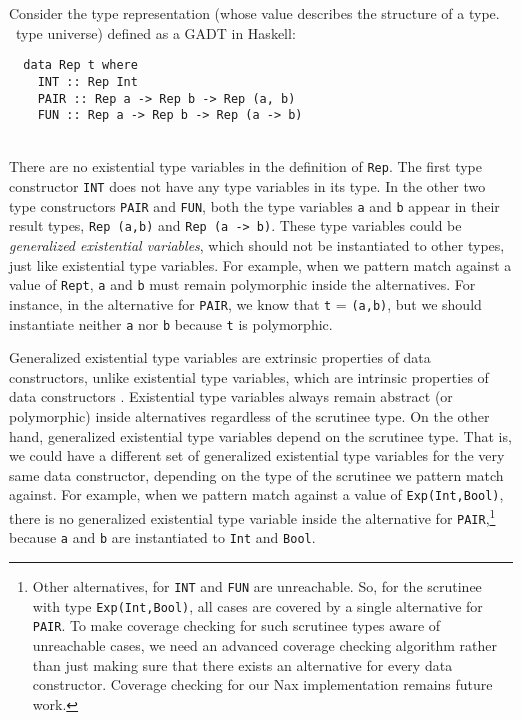 Consider the type representation (whose value describes the structure of
a type. \aka\ type universe) defined as a GADT in Haskell:
\vspace*{-5ex}
\begin{singlespace}
\begin{verbatim}
  data Rep t where
    INT :: Rep Int
    PAIR :: Rep a -> Rep b -> Rep (a, b)
    FUN :: Rep a -> Rep b -> Rep (a -> b)
\end{verbatim}
\end{singlespace}
~\vspace*{-5ex}\\
There are no existential type variables in the definition of \texttt{Rep}.
The first type constructor \texttt{INT} does not have any type variables
in its type. In the other two type constructors \texttt{PAIR} and \texttt{FUN},
both the type variables \texttt{a} and \texttt{b} appear in their result types,
\texttt{\;Rep~(a,b)\;} and \texttt{\;Rep~(a -> b)\;}. These type variables
could be \emph{generalized existential variables}, which should not be
instantiated to other types, just like existential type variables.
For example, when we pattern match against a value of \texttt{\;Rep\;t},
\texttt{a} and \texttt{b} must remain polymorphic inside the alternatives.
For instance, in the alternative for \texttt{PAIR}, we know that
\texttt{t} = \texttt{(a,b)}, but we should instantiate neither \texttt{a}
nor \texttt{b} because \texttt{t} is polymorphic.

Generalized existential type variables are
extrinsic properties of data constructors, unlike existential type variables,
which are intrinsic properties of data constructors \cite{Lin10thesis}.
Existential type variables always remain abstract (or polymorphic) inside
alternatives regardless of the scrutinee type. On the other hand,
generalized existential type variables depend on the scrutinee type. That is,
we could have a different set of generalized existential type variables
for the very same data constructor, depending on the type of the scrutinee
we pattern match against. For example, when we pattern match against
a value of \texttt{Exp\;(Int,Bool)}, there is no generalized existential
type variable inside the alternative for \texttt{PAIR},\footnote{
	Other alternatives, for \texttt{INT} and \texttt{FUN} are unreachable.
	So, for the scrutinee with type \texttt{Exp\;(Int,Bool)}, all cases
	are covered by a single alternative for \texttt{PAIR}.
	To make coverage checking for such scrutinee types aware of
	unreachable cases, we need an advanced coverage checking algorithm
	rather than just making sure that there exists an alternative for
	every data constructor. Coverage checking for our Nax implementation
	remains future work.}
because
\texttt{a} and \texttt{b} are instantiated to \texttt{Int} and \texttt{Bool}.

